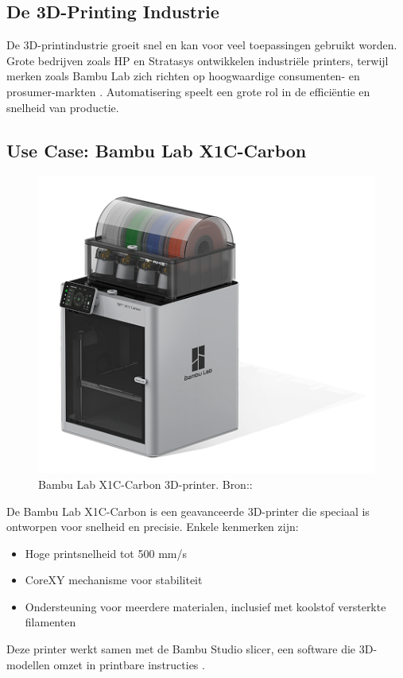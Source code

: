 \newpage
\subsection{De 3D-Printing Industrie}
De 3D-printindustrie groeit snel en kan voor veel toepassingen gebruikt worden. Grote bedrijven zoals HP en Stratasys ontwikkelen industriële printers, terwijl merken zoals Bambu Lab zich richten op hoogwaardige consumenten- en prosumer-markten \autocite{3dPrintingIndustry}. Automatisering speelt een grote rol in de efficiëntie en snelheid van productie.

\subsection{Use Case: Bambu Lab X1C-Carbon}
\begin{figure} %
    \centering
    \includegraphics[width=0.8\linewidth]{Foto's/X1C}
    \caption{Bambu Lab X1C-Carbon 3D-printer. Bron::~\autocite{bambulabImage}}
    \label{fig:x1c}
\end{figure}
De Bambu Lab X1C-Carbon is een geavanceerde 3D-printer die speciaal is ontworpen voor snelheid en precisie. Enkele kenmerken zijn:
\begin{itemize}
    \item Hoge printsnelheid tot 500 mm/s
    \item CoreXY mechanisme voor stabiliteit
    \item Ondersteuning voor meerdere materialen, inclusief met koolstof versterkte filamenten
\end{itemize}
Deze printer werkt samen met de Bambu Studio slicer, een software die 3D-modellen omzet in printbare instructies \autocite{bambulabX1Carbon}.


